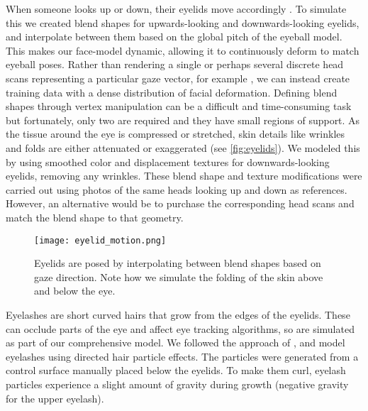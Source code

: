 When someone looks up or down, their eyelids move accordingly \cite{liversedge2011oxford}.
To simulate this we created blend shapes for upwards-looking and downwards-looking eyelids, and interpolate between them based on the global pitch of the eyeball model.
This makes our face-model dynamic, allowing it to continuously deform to match eyeball poses.
Rather than rendering a single or perhaps several discrete head scans representing a particular gaze vector, for example \cite{sugano2014learning}, we can instead create training data with a dense distribution of facial deformation.
Defining blend shapes through vertex manipulation can be a difficult and time-consuming task but fortunately, only two are required and they have small regions of support.
As the tissue around the eye is compressed or stretched, skin details like wrinkles and folds are either attenuated or exaggerated (see \autoref{fig:eyelids}).
We modeled this by using smoothed color and displacement textures for downwards-looking eyelids, removing any wrinkles.
These blend shape and texture modifications were carried out using photos of the same heads looking up and down as references.
However, an alternative would be to purchase the corresponding head scans and match the blend shape to that geometry.

\begin{figure}
    \texttt{[image: eyelid\_motion.png]}
    \caption{Eyelids are posed by interpolating between blend shapes based on gaze direction. Note how we simulate the folding of the skin above and below the eye.}
    \label{fig:eyelids}
\end{figure}


Eyelashes are short curved hairs that grow from the edges of the eyelids.
These can occlude parts of the eye and affect eye tracking algorithms, so are simulated as part of our comprehensive model.
We followed the approach of \citet{swirski2014rendering}, and model eyelashes using directed hair particle effects.
The particles were generated from a control surface manually placed below the eyelids.
To make them curl, eyelash particles experience a slight amount of gravity during growth (negative gravity for the upper eyelash).

